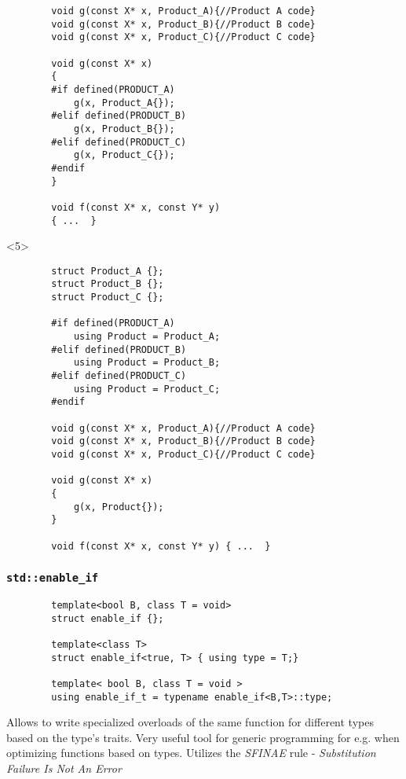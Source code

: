 \documentclass{beamer}
\begin{document}
\begin{frame}[fragile,t]
\begin{onlyenv}
\begin{lstlisting}
        void g(const X* x, Product_A){//Product A code}
        void g(const X* x, Product_B){//Product B code}
        void g(const X* x, Product_C){//Product C code}
        
        void g(const X* x)
        {
        #if defined(PRODUCT_A)
            g(x, Product_A{});
        #elif defined(PRODUCT_B)
            g(x, Product_B{});
        #elif defined(PRODUCT_C)
            g(x, Product_C{});
        #endif
        }

        void f(const X* x, const Y* y)
        { ...  }
    \end{lstlisting}
    \end{onlyenv}

    \begin{onlyenv}<5>
    \begin{lstlisting}
        struct Product_A {};
        struct Product_B {};
        struct Product_C {};

        #if defined(PRODUCT_A)
            using Product = Product_A;
        #elif defined(PRODUCT_B)
            using Product = Product_B;
        #elif defined(PRODUCT_C)
            using Product = Product_C;
        #endif

        void g(const X* x, Product_A){//Product A code}
        void g(const X* x, Product_B){//Product B code}
        void g(const X* x, Product_C){//Product C code}
        
        void g(const X* x)
        {
            g(x, Product{}); 
        }

        void f(const X* x, const Y* y) { ...  }
    \end{lstlisting}
    \end{onlyenv}
\end{frame}

\begin{frame}[fragile,t]
\frametitle{\texttt{std::enable\_if}}
    \begin{lstlisting}
        template<bool B, class T = void>
        struct enable_if {};
         
        template<class T>
        struct enable_if<true, T> { using type = T;}

        template< bool B, class T = void >
        using enable_if_t = typename enable_if<B,T>::type;
    \end{lstlisting}
    

    \pause
    Allows to write specialized overloads of the same function
    for different types based on the type's traits.
    Very useful tool for generic programming for e.g. when optimizing functions based on types. 
    \newline \newline
    Utilizes the \textit{SFINAE} rule - \textit{Substitution Failure Is Not An Error}

\end{frame}
\end{document}
